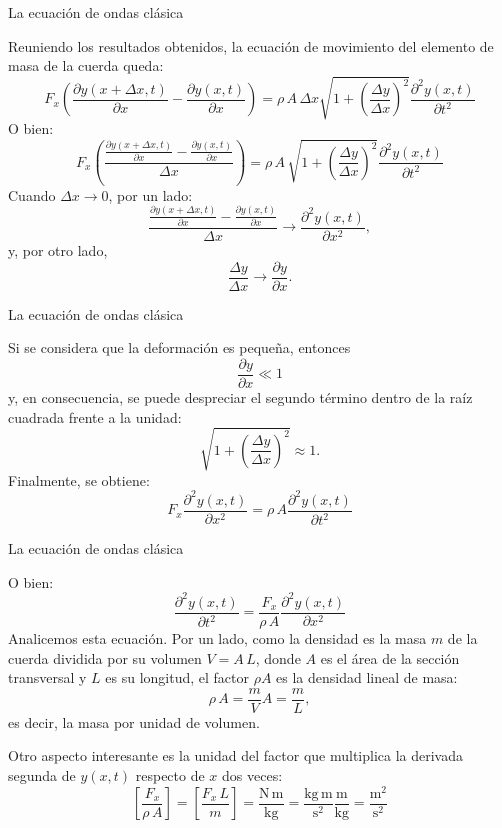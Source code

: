 \documentclass[11pt,handout,aspectratio=1610]{beamer}
\newcommand{\pdiff}[2]{\frac{\partial #1}{\partial #2}}
\newcommand{\pddiff}[2]{\frac{\partial^2 #1}{\partial #2^2}}
\newcommand{\vs}{\vspace{11pt}}
\newcommand{\un}[1]{\text{#1}}
\begin{document}
\begin{frame}{La ecuación de ondas clásica}

    Reuniendo los resultados obtenidos, la ecuación de movimiento del elemento de masa de la cuerda queda: $$ F_x \left(\pdiff{y \left(x+\Delta x,t\right)}{x} - \pdiff{y \left(x,t\right)}{x}\right) = \rho \, A \, \Delta x \sqrt{1 + \left(\frac{\Delta y}{\Delta x}\right)^2} \pddiff{y \left(x,t\right)}{t} $$ O bien: $$ F_x \left( \frac{\pdiff{y \left(x+\Delta x,t\right)}{x} - \pdiff{y \left(x,t\right)}{x}}{\Delta x}\right) = \rho \, A \, \sqrt{1 + \left(\frac{\Delta y}{\Delta x}\right)^2} \pddiff{y \left(x,t\right)}{t} $$ Cuando $\Delta x \to 0$, por un lado: $$ \frac{\pdiff{y \left(x+\Delta x,t\right)}{x} - \pdiff{y \left(x,t\right)}{x}}{\Delta x} \to \pddiff{y \left(x,t\right)}{x}, $$ y, por otro lado, $$ \frac{\Delta y}{\Delta x} \to \pdiff{y}{x}.$$

\end{frame}

\begin{frame}{La ecuación de ondas clásica}

    Si se considera que la deformación es pequeña, entonces $$ \pdiff{y}{x} \ll 1 $$ y, en consecuencia, se puede despreciar el segundo término dentro de la raíz cuadrada frente a la unidad: $$ \sqrt{1 + \left(\frac{\Delta y}{\Delta x}\right)^2} \approx 1 .$$ Finalmente, se obtiene: $$ F_x \pddiff{y \left(x,t\right)}{x} = \rho \, A \pddiff{y \left(x,t\right)}{t} $$ 

\end{frame}

\begin{frame}{La ecuación de ondas clásica}

    O bien: $$ \pddiff{y \left(x,t\right)}{t} = \frac{F_x}{\rho \, A} \pddiff{y \left(x,t\right)}{x} $$ Analicemos esta ecuación. Por un lado, como la densidad es la masa $m$ de la cuerda dividida por su volumen $V = A \, L$, donde $A$ es el área de la sección transversal y $L$ es su longitud, el factor $\rho A$ es la densidad lineal de masa: $$ \rho \, A = \frac{m}{V} A = \frac{m}{L},$$ es decir, la masa por unidad de volumen.

    \vs 

    Otro aspecto interesante es la unidad del factor que multiplica la derivada segunda de $y(x,t)$ respecto de $x$ dos veces: $$ \left[\frac{F_x}{\rho \, A}\right] = \left[\frac{F_x \, L}{m}\right] = \frac{\text{N} \, \un{m}}{\un{kg}} = \frac{\un{kg} \, \un{m}}{\un{s}^2} \frac{\un{m}}{\un{kg}} = \frac{\un{m}^2}{\un{s}^2}$$ 

\end{frame}
\end{document}
